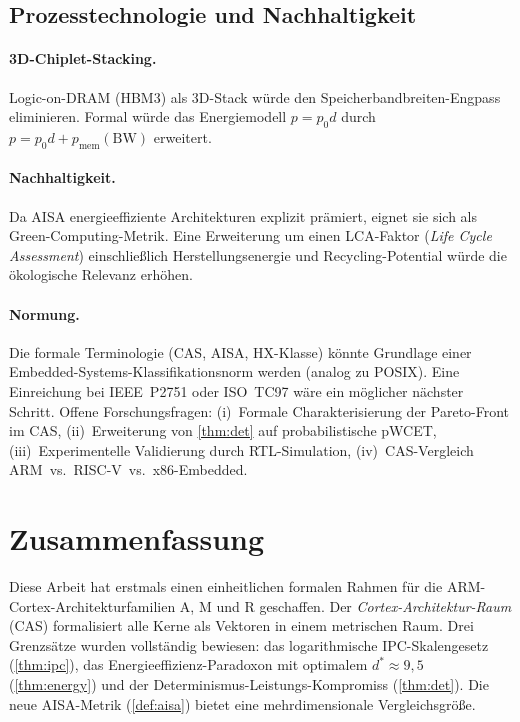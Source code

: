 ﻿\documentclass[a4paper,12pt]{article}
\theoremstyle{plain}
\theoremstyle{definition}
\theoremstyle{remark}
\begin{document}
\subsection{Prozesstechnologie und Nachhaltigkeit}

\paragraph{3D-Chiplet-Stacking.}
Logic-on-DRAM (HBM3) als 3D-Stack w\"urde den Speicherband\-breiten-Engpass
eliminieren. Formal w\"urde das Energiemodell $p=p_0 d$ durch
$p=p_0 d+p_\mathrm{mem}(\mathrm{BW})$ erweitert.

\paragraph{Nachhaltigkeit.}
Da AISA energieeffiziente Architekturen explizit pr\"amiert, eignet sie sich
als Green-Computing-Metrik. Eine Erweiterung um einen LCA-Faktor
(\emph{Life Cycle Assessment}) einschlie\ss{}lich Herstellungsenergie und
Recycling-Potential w\"urde die \"okologische Relevanz erh\"ohen.

\paragraph{Normung.}
Die formale Terminologie (CAS, AISA, HX-Klasse) k\"onnte Grundlage einer
Embedded-Systems-Klassifikationsnorm werden (analog zu POSIX). Eine Einreichung
bei IEEE~P2751 oder ISO~TC97 w\"are ein m\"oglicher n\"achster Schritt.
Offene Forschungsfragen: (i)~Formale Charakterisierung der Pareto-Front im CAS,
(ii)~Erweiterung von \cref{thm:det} auf probabilistische pWCET,
(iii)~Experimentelle Validierung durch RTL-Simulation,
(iv)~CAS-Vergleich ARM~vs.\ RISC-V~vs.\ x86-Embedded.

\section{Zusammenfassung}\label{sec:conclusion}

Diese Arbeit hat erstmals einen einheitlichen formalen Rahmen f\"ur die
ARM-Cortex-Architekturfamilien A, M und R geschaffen. Der
\emph{Cortex-Architektur-Raum} (CAS) formalisiert alle Kerne als Vektoren in
einem metrischen Raum. Drei Grenzs\"atze wurden vollst\"andig bewiesen:
das logarithmische IPC-Skalengesetz (\cref{thm:ipc}), das Energieeffizienz-Paradoxon
mit optimalem $d^*\approx9{,}5$ (\cref{thm:energy}) und der
Determinismus-Leistungs-Kompromiss (\cref{thm:det}). Die neue AISA-Metrik
(\cref{def:aisa}) bietet eine mehrdimensionale Vergleichsgr\"o\ss{}e.
\end{document}
